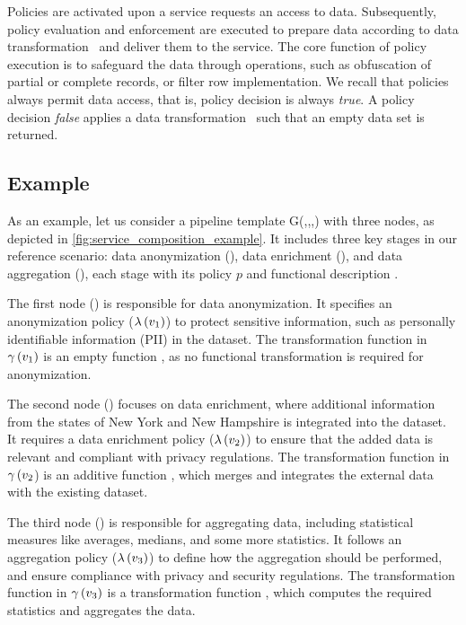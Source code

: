 Policies are activated upon a service requests an access to data. Subsequently, policy evaluation and enforcement are executed to prepare data according to data transformation \TP\ and deliver them to the service. The core function of policy execution is to safeguard the data through operations, such as obfuscation of partial or complete records, or filter row implementation. We recall that policies always permit data access, that is, policy decision is always \emph{true}. A policy decision \emph{false} applies a data transformation \TP\ such that an empty data set is returned.

\subsection{Example}\label{sec:example}
As an example, let us consider a pipeline template G(\V,\E,\myLambda,\myGamma) with three nodes, as depicted in \cref{fig:service_composition_example}.
It includes three key stages in our reference scenario: data anonymization (), data enrichment (), and data aggregation (), each stage with its policy $p$ and functional description \F.

The first node () is responsible for data anonymization. It specifies an anonymization policy ($\lambda\,(v_1)$) to protect sensitive information, such as personally identifiable information (PII) in the dataset. The transformation function  in $\gamma\,(v_1)$ is an empty function , as no functional transformation is required for anonymization.

The second node () focuses on data enrichment, where additional information from the states of New York and New Hampshire is integrated into the dataset. It requires a data enrichment policy ($\lambda\,(v_2)$) to ensure that the added data is relevant and compliant with privacy regulations. The transformation function  in $\gamma\,(v_2$) is an additive function , which merges and integrates the external data with the existing dataset.

  The third node () is responsible for aggregating data, including statistical measures like averages, medians, and some more statistics. It follows an aggregation policy ($\lambda\,(v_3)$) to define how the aggregation should be performed, and ensure compliance with privacy and security regulations. The transformation function  in $\gamma\,(v_3)$ is a transformation function , which computes the required statistics and aggregates the data.


